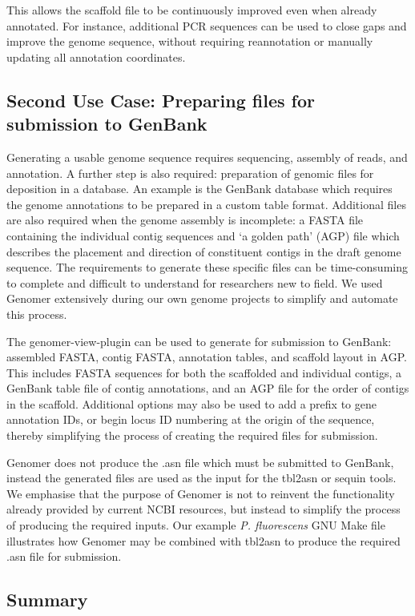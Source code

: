 \documentclass[10pt]{article}
\begin{document}
This allows the scaffold file to be continuously improved even when already
annotated. For instance, additional PCR sequences can be used to close gaps and
improve the genome sequence, without requiring reannotation or manually
updating all annotation coordinates.

\subsection*{Second Use Case: Preparing files for submission to GenBank}

Generating a usable genome sequence requires sequencing, assembly of reads, and
annotation. A further step is also required: preparation of genomic files for
deposition in a database. An example is the GenBank database which requires the
genome annotations to be prepared in a custom table format. Additional files
are also required when the genome assembly is incomplete: a FASTA file
containing the individual contig sequences and `a golden path' (AGP)
\cite{agp-spec} file which describes the placement and direction of constituent
contigs in the draft genome sequence. The requirements to generate these
specific files can be time-consuming to complete and difficult to understand
for researchers new to field. We used Genomer extensively during our own genome
projects to simplify and automate this process.

The genomer-view-plugin can be used to generate for submission to GenBank:
assembled FASTA, contig FASTA, annotation tables, and scaffold layout in AGP.
This includes FASTA sequences for both the scaffolded and individual contigs, a
GenBank table file of contig annotations, and an AGP file for the order of
contigs in the scaffold. Additional options may also be used to add a prefix to
gene annotation IDs, or begin locus ID numbering at the origin of the sequence,
thereby simplifying the process of creating the required files for submission.

Genomer does not produce the .asn file which must be submitted to GenBank,
instead the generated files are used as the input for the tbl2asn or sequin
tools. We emphasise that the purpose of Genomer is not to reinvent the
functionality already provided by current NCBI resources, but instead to
simplify the process of producing the required inputs. Our example \emph{P.
fluorescens} GNU Make file \cite{genome-github} illustrates how Genomer may be
combined with tbl2asn to produce the required .asn file for submission.

\subsection*{Summary}
\end{document}
